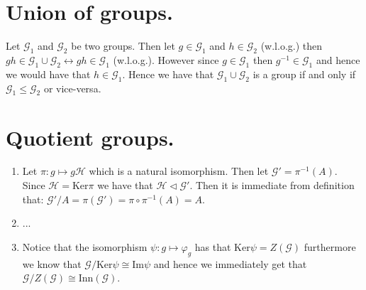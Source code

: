 \documentclass[10pt,a4paper]{book}
\begin{document}
\section{Union of groups.}
Let $\mathcal{G}_1$ and $\mathcal{G}_2$ be two groups. Then let $g \in \mathcal{G}_1$ and $h \in \mathcal{G}_2$ (w.l.o.g.) then $gh \in \mathcal{G}_1 \cup \mathcal{G}_2 \leftrightarrow gh \in \mathcal{G}_1$ (w.l.o.g.). However since $g \in \mathcal{G}_1$ then $g^{-1} \in \mathcal{G}_1$ and hence we would have that $h \in \mathcal{G}_1$. Hence we have that $\mathcal{G}_1 \cup \mathcal{G}_2$ is a group if and only if $\mathcal{G}_1 \leqslant \mathcal{G}_2$ or vice-versa.   

\section{Quotient groups.}
\begin{enumerate}
\item Let $\pi : g \mapsto g \mathcal{H}$ which is a natural isomorphism. Then let $\mathcal{G}' = \pi^{-1}(A)$. Since $\mathcal{H} = \text{Ker}\pi$ we have that $\mathcal{H} \triangleleft \mathcal{G}'$. Then it is immediate from definition that: $\mathcal{G}'/A = \pi(\mathcal{G}') = \pi \circ \pi^{-1} (A) = A$. 
\item ...
\item Notice that the isomorphism $\psi : g \mapsto \varphi_g$ has that $\text{Ker} \psi = Z( \mathcal{G})$ furthermore we know that $\mathcal{G}/\text{Ker} \psi \cong \text{Im} \psi$ and hence we immediately get that $\mathcal{G}/Z(\mathcal{G}) \cong \text{Inn}(\mathcal{G})$. 
\end{enumerate}
\end{document}
